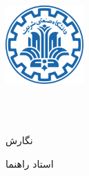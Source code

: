 

\begin{center}
\includegraphics[width=3cm]{figs/logo.pdf} \\ [-0.2em]
\ThesisUniversity \\ [-0.2em]
\ThesisDepartment

\vspace{0.75cm}
\ThesisDegree \\ [-0.2em]
\ThesisMajor

\vspace{2cm}
{\LARGE\textbf{\ThesisTitle}}

\vspace{2.5cm}
نگارش \\ [0.5em]
{\large\textbf{\ThesisAuthor}}

\vspace{1cm}
استاد راهنما \\ [0.5em]
{\large\textbf{\ThesisSupervisor}}

\vspace{1.5cm}
\ThesisDate
\end{center}
